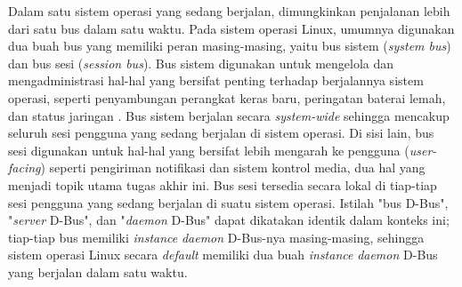 Dalam satu sistem operasi yang sedang berjalan, dimungkinkan penjalanan lebih dari satu bus dalam satu waktu. Pada sistem operasi Linux, umumnya digunakan dua buah bus yang memiliki peran masing-masing, yaitu bus sistem (\textit{system bus}) dan bus sesi (\textit{session bus}). Bus sistem digunakan untuk mengelola dan mengadministrasi hal-hal yang bersifat penting terhadap berjalannya sistem operasi, seperti penyambungan perangkat keras baru, peringatan baterai lemah, dan status jaringan \cite{will2020trusted}. Bus sistem berjalan secara \textit{system-wide} sehingga mencakup seluruh sesi pengguna yang sedang berjalan di sistem operasi. Di sisi lain, bus sesi digunakan untuk hal-hal yang bersifat lebih mengarah ke pengguna (\textit{user-facing}) seperti pengiriman notifikasi dan sistem kontrol media, dua hal yang menjadi topik utama tugas akhir ini. Bus sesi tersedia secara lokal di tiap-tiap sesi pengguna yang sedang berjalan di suatu sistem operasi. Istilah "bus D-Bus", "\textit{server} D-Bus", dan "\textit{daemon} D-Bus" dapat dikatakan identik dalam konteks ini; tiap-tiap bus memiliki \textit{instance} \textit{daemon} D-Bus-nya masing-masing, sehingga sistem operasi Linux secara \textit{default} memiliki dua buah \textit{instance} \textit{daemon} D-Bus yang berjalan dalam satu waktu.


